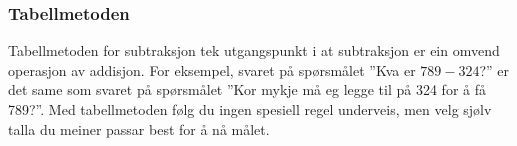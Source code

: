 \subsubsection{Tabellmetoden}
Tabellmetoden for subtraksjon tek utgangspunkt i at subtraksjon er ein omvend operasjon av addisjon. For eksempel, svaret på spørsmålet ''Kva er $ 789-324 $?'' er det same som svaret på spørsmålet ''Kor mykje må eg legge til på 324 for å få 789?''. Med tabellmetoden følg du ingen spesiell regel underveis, men velg sjølv talla du meiner passar best for å nå målet.\\
\begin{center}
\parbox{0.35\linewidth}{
} \qquad
\parbox{0.35\linewidth}{
	} \\[12pt]
\parbox{0.35\linewidth}{
	} \qquad 
\parbox{0.4\linewidth}{
	}
\end{center}
